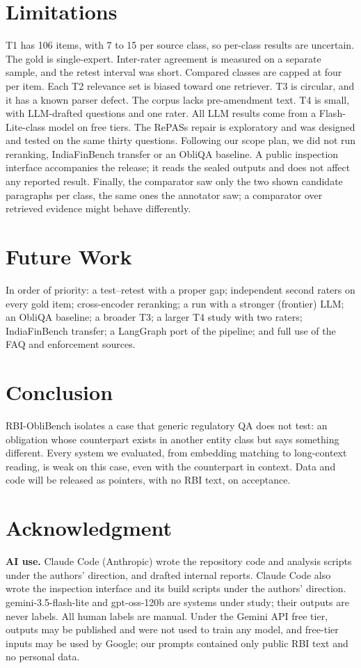 \documentclass[conference]{IEEEtran}
\begin{document}
\section{Limitations}\label{sec:limitations}
T1 has 106 items, with 7 to 15 per source class, so per-class results are uncertain. The
gold is single-expert. Inter-rater agreement is measured on a separate sample, and the retest interval was short. Compared classes
are capped at four per item. Each T2 relevance set is biased toward one retriever. T3 is circular, and it has a known parser defect.
The corpus lacks pre-amendment text. T4 is small, with LLM-drafted questions and one rater. All LLM results come from a
Flash-Lite-class model on free tiers. The RePASs repair is exploratory and was designed and tested on the same thirty questions. Following our scope plan, we did not run
reranking, IndiaFinBench transfer or an ObliQA baseline. A public inspection interface accompanies the release; it reads the sealed outputs and does not affect any reported result. Finally, the comparator saw only the two shown
candidate paragraphs per class, the same ones the annotator saw; a comparator over retrieved evidence might behave differently.

\section{Future Work}\label{sec:future}
In order of priority: a test--retest with a proper gap; independent second raters on every gold item; cross-encoder reranking;
a run with a stronger (frontier) LLM; an ObliQA baseline; a broader T3; a larger T4 study with two raters; IndiaFinBench transfer;
a LangGraph port of the pipeline; and full use of the FAQ and enforcement sources.

\section{Conclusion}\label{sec:conclusion}
RBI-ObliBench isolates a case that generic regulatory QA does not test: an obligation whose counterpart exists in another entity
class but says something different. Every system we evaluated, from embedding matching to long-context reading, is weak on this
case, even with the counterpart in context. Data and code will be released as pointers, with no RBI text, on acceptance.

\section*{Acknowledgment}
\textbf{AI use.} Claude Code (Anthropic) wrote the repository code and analysis scripts under the authors' direction, and drafted
internal reports. Claude Code also wrote the inspection interface and its build scripts under the authors' direction. gemini-3.5-flash-lite and gpt-oss-120b are systems under study; their outputs are never labels. All human labels
are manual. Under the Gemini API free tier, outputs may be published and were not used to train any model, and free-tier inputs may
be used by Google; our prompts contained only public RBI text and no personal data.



\end{document}
